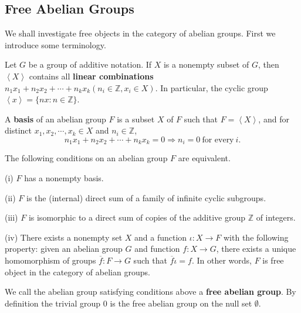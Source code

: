 \subsection{Free Abelian Groups}
We shall investigate free objects in the category of abelian groups. First we introduce some terminology.\par
Let $G$ be a group of additive notation. If $X$ is a nonempty subset of $G$, then $\left<X\right>$ contains all \textbf{linear combinations} $n_1x_1+n_2x_2+\cdots+n_kx_k(n_i\in\mathbb{Z},x_i\in X)$. In particular, the cyclic group $\left<x\right>=\{nx:n\in\mathbb{Z}\}$.\par
A \textbf{basis} of an abelian group $F$ is a subset $X$ of $F$ such that $F=\left<X\right>$, and for distinct $x_1,x_2,\cdots,x_k\in X$ and $n_i\in\mathbb{Z}$, 
$$n_1x_1+n_2x_2+\cdots+n_kx_k=0\Rightarrow n_i=0\ \text{for every} \ i.$$
\begin{theorem}
The following conditions on an abelian group $F$ are equivalent.\par
(i) $F$ has a nonempty basis.\par
(ii) $F$ is the (internal) direct sum of a family of infinite cyclic subgroups.\par
(iii) $F$ is isomorphic to a direct sum of copies of the additive group $\mathbb{Z}$ of integers.\par
(iv) There exists a nonempty set $X$ and a function $\iota:X\to F$ with the following property: given an abelian group $G$ and function $f:X\to G$, there exists a unique homomorphism of groups $\overline{f}:F\to G$ such that $\overline{f}\iota=f$. In other words, $F$ is free object in the category of abelian groups.
\end{theorem}
We call the abelian group satisfying conditions above a \textbf{free abelian group}. By definition the trivial group $0$ is the free abelian group on the null set $\emptyset$.
